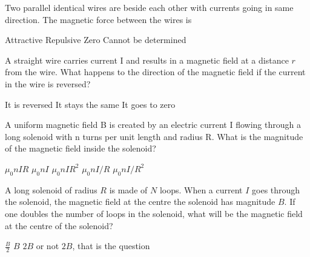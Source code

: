 \question Two parallel identical wires are beside each other with currents going in same direction. The magnetic force between the wires is
\begin{checkboxes}
\CorrectChoice Attractive \correct
\choice Repulsive
\choice Zero
\choice Cannot be determined
\end{checkboxes}

\question A straight wire carries current I and results in a magnetic field at a distance $r$ from the wire. What happens to the direction of the magnetic field if the current in the wire is reversed?
\begin{checkboxes}
\CorrectChoice It is reversed \correct
\choice It stays the same
\choice It goes to zero
\end{checkboxes}

\question A uniform magnetic field B is created by an electric current I flowing through a long solenoid with n turns per unit length and radius R. What is the magnitude of the magnetic field inside the solenoid?
\begin{checkboxes}
\choice $\mu_0 n I R$
\CorrectChoice $\mu_0 n I$ \correct
\choice $\mu_0 n I R^2$
\choice $\mu_0 n I/R$
\choice $\mu_0 n I/R^2$
\end{checkboxes}

\question A long solenoid of radius $R$ is made of $N$ loops. When a current $I$ goes through the solenoid, the magnetic field at the centre the solenoid has magnitude $B$. If one doubles the number of loops in the solenoid, what will be the magnetic field at the centre of the solenoid?
\begin{choices} 
\choice $\frac{B}{2}$
\choice $B$
\CorrectChoice $2B$ \correct
\choice or not $2B$, that is the question
\end{choices}
%
%
